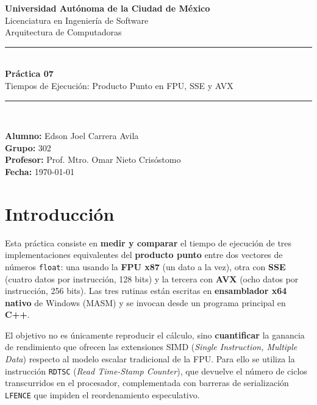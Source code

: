 \documentclass[12pt, letterpaper]{article}
\begin{document}
\begin{titlepage}
    \centering
    \vspace*{1.5cm}

    {\Large \textbf{Universidad Autónoma de la Ciudad de México}}\\[0.3cm]
    {\large Licenciatura en Ingeniería de Software}\\[0.2cm]
    {\large Arquitectura de Computadoras}\\[2.5cm]

    \rule{\linewidth}{0.5pt}\\[0.4cm]
    {\LARGE \bfseries Práctica 07}\\[0.3cm]
    {\Large Tiempos de Ejecución: Producto Punto en FPU, SSE y AVX}\\[0.3cm]
    \rule{\linewidth}{0.5pt}\\[2cm]

    \begin{flushleft}
        \textbf{Alumno:} Edson Joel Carrera Avila \\[0.3cm]
        \textbf{Grupo:} 302 \\[0.3cm]
        \textbf{Profesor:} Prof. Mtro. Omar Nieto Crisóstomo \\[0.3cm]
        \textbf{Fecha:} \today
    \end{flushleft}
    \vfill
\end{titlepage}

\tableofcontents
\newpage

\section{Introducción}

Esta práctica consiste en \textbf{medir y comparar} el tiempo de ejecución de tres implementaciones equivalentes del \textbf{producto punto} entre dos vectores de números \texttt{float}: una usando la \textbf{FPU x87} (un dato a la vez), otra con \textbf{SSE} (cuatro datos por instrucción, 128 bits) y la tercera con \textbf{AVX} (ocho datos por instrucción, 256 bits). Las tres rutinas están escritas en \textbf{ensamblador x64 nativo} de Windows (MASM) y se invocan desde un programa principal en \textbf{C++}.

El objetivo no es únicamente reproducir el cálculo, sino \textbf{cuantificar} la ganancia de rendimiento que ofrecen las extensiones SIMD (\textit{Single Instruction, Multiple Data}) respecto al modelo escalar tradicional de la FPU. Para ello se utiliza la instrucción \texttt{RDTSC} (\textit{Read Time-Stamp Counter}), que devuelve el número de ciclos transcurridos en el procesador, complementada con barreras de serialización \texttt{LFENCE} que impiden el reordenamiento especulativo.
\end{document}
